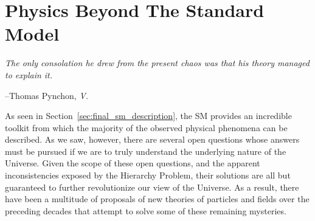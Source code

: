 \chapter{Physics Beyond The Standard Model}
\label{chap:bsm}

\epigraph{\textit{The only consolation he drew from the present chaos was that his theory managed to explain it.}}{--Thomas Pynchon, \textit{V.}}

%


%
%

As seen in Section~\ref{sec:final_sm_description}, the SM provides an incredible toolkit
from which the majority of the observed physical phenomena can be described.
As we saw, however, there are several open questions whose answers must be pursued
if we are to truly understand the underlying nature of the Universe.
Given the scope of these open questions, and the apparent inconsistencies exposed by the Hierarchy Problem,
their solutions are all but guaranteed to further revolutionize our view of the Universe.
As a result, there have been a multitude of proposals of new theories of particles and fields over the preceding decades that attempt
to solve some of these remaining mysteries.


